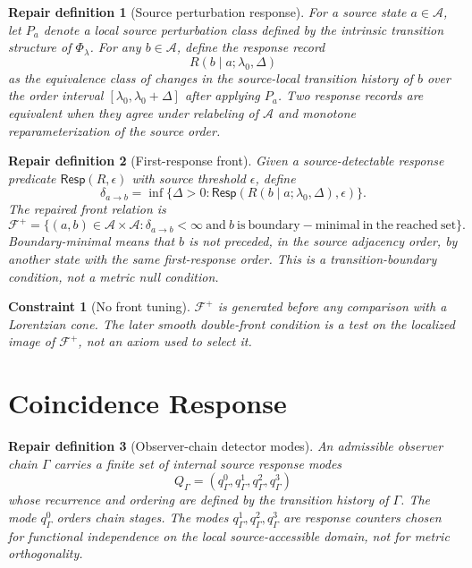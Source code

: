 \documentclass[11pt]{article}
\newcommand{\Sub}{\mathcal{A}}
\newcommand{\PhiFlow}{\Phi_{\lambda}}
\newcommand{\Front}{\mathcal{F}}
\newtheorem{repairdefinition}{Repair definition}
\newtheorem{constraint}{Constraint}
\begin{document}
\begin{repairdefinition}[Source perturbation response]
For a source state \(a\in\Sub\), let \(P_a\) denote a local source
perturbation class defined by the intrinsic transition structure of
\(\PhiFlow\). For any \(b\in\Sub\), define the response record
\[
R(b\mid a;\lambda_0,\Delta)
\]
as the equivalence class of changes in the source-local transition history of
\(b\) over the order interval \([\lambda_0,\lambda_0+\Delta]\) after applying
\(P_a\). Two response records are equivalent when they agree under relabeling
of \(\Sub\) and monotone reparameterization of the source order.
\end{repairdefinition}

\begin{repairdefinition}[First-response front]
Given a source-detectable response predicate
\(\mathsf{Resp}(R,\epsilon)\) with source threshold \(\epsilon\), define
\[
\delta_{a\to b}
=
\inf\{\Delta>0:\mathsf{Resp}(R(b\mid a;\lambda_0,\Delta),\epsilon)\}.
\]
The repaired front relation is
\[
\Front^{+}
=
\{(a,b)\in\Sub\times\Sub:\delta_{a\to b}<\infty
\ \mathrm{and}\ b\ \mathrm{is\ boundary-minimal\ in\ the\ reached\ set}\}.
\]
Boundary-minimal means that \(b\) is not preceded, in the source adjacency
order, by another state with the same first-response order. This is a
transition-boundary condition, not a metric null condition.
\end{repairdefinition}

\begin{constraint}[No front tuning]
\(\Front^{+}\) is generated before any comparison with a Lorentzian cone. The
later smooth double-front condition is a test on the localized image of
\(\Front^{+}\), not an axiom used to select it.
\end{constraint}

\section{Coincidence Response}

\begin{repairdefinition}[Observer-chain detector modes]
An admissible observer chain \(\Gamma\) carries a finite set of internal source
response modes
\[
Q_{\Gamma}=(q^0_{\Gamma},q^1_{\Gamma},q^2_{\Gamma},q^3_{\Gamma})
\]
whose recurrence and ordering are defined by the transition history of
\(\Gamma\). The mode \(q^0_{\Gamma}\) orders chain stages. The modes
\(q^1_{\Gamma},q^2_{\Gamma},q^3_{\Gamma}\) are response counters chosen for
functional independence on the local source-accessible domain, not for metric
orthogonality.
\end{repairdefinition}
\end{document}
